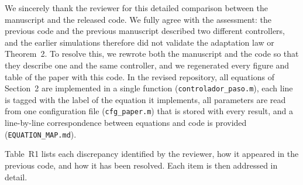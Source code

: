 
\begin{reply}
We sincerely thank the reviewer for this detailed comparison between the manuscript and the released code. We fully agree with the assessment: the previous code and the previous manuscript described two different controllers, and the earlier simulations therefore did not validate the adaptation law or Theorem~2. To resolve this, we rewrote both the manuscript and the code so that they describe one and the same controller, and we regenerated every figure and table of the paper with this code. In the revised repository, all equations of Section~2 are implemented in a single function (\texttt{controlador\_paso.m}), each line is tagged with the label of the equation it implements, all parameters are read from one configuration file (\texttt{cfg\_paper.m}) that is stored with every result, and a line-by-line correspondence between equations and code is provided (\texttt{EQUATION\_MAP.md}).

Table~R1 lists each discrepancy identified by the reviewer, how it appeared in the previous code, and how it has been resolved. Each item is then addressed in detail.


\end{reply}

